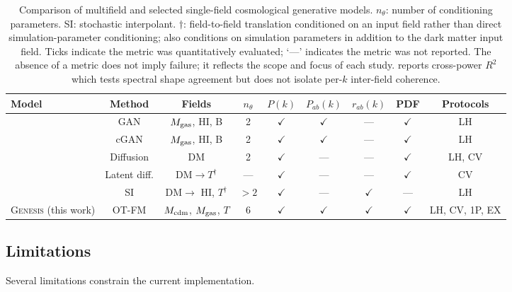 \documentclass[usenatbib]{mnras}
\newcommand{\Mcdm}{M_{\rm cdm}}
\newcommand{\Mgas}{M_{\rm gas}}
\newcommand{\Tgas}{T}
\begin{document}
\begin{table}
  \centering
  \begin{tabular}{lcccccccc}
    \hline
    Model & Method & Fields & $n_\theta$ & $P(k)$ & $P_{ab}(k)$ &
      $r_{ab}(k)$ & PDF & Protocols \\
    \hline
    \citet{Andrianomena2022} & GAN & $\Mgas$, HI, B & 2
      & $\checkmark$ & $\checkmark$ & --- & $\checkmark$ & LH \\
    \citet{Andrianomena2024} & cGAN & $\Mgas$, HI, B & 2
      & $\checkmark$ & $\checkmark$ & --- & $\checkmark$ & LH \\
    \citet{Mudur2024} & Diffusion & DM & 2
      & $\checkmark$ & --- & --- & $\checkmark$ & LH, CV \\
    \citet{Mishra2026} & Latent diff. & DM$\rightarrow T^\dagger$ & ---
      & $\checkmark$ & --- & --- & $\checkmark$ & CV \\
    \citet{Horowitz2025} & SI & DM$\rightarrow$ HI, $T^\dagger$ & $>2$
      & $\checkmark$ & --- & $\checkmark$ & --- & LH \\
    \textsc{Genesis} (this work) & OT-FM
      & $\Mcdm$, $\Mgas$, $\Tgas$ & 6
      & $\checkmark$ & $\checkmark$ & $\checkmark$ & $\checkmark$
      & LH, CV, 1P, EX \\
    \hline
  \end{tabular}
  \caption{Comparison of multifield and selected single-field
    cosmological generative models.
    $n_\theta$: number of conditioning parameters.
    SI: stochastic interpolant.
    $\dagger$: field-to-field translation conditioned on an input field
    rather than direct simulation-parameter conditioning;
    \citet{Horowitz2025} also conditions on simulation parameters in
    addition to the dark matter input field.
    Ticks indicate the metric was quantitatively evaluated;
    `---' indicates the metric was not reported.
    The absence of a metric does not imply failure; it reflects the
    scope and focus of each study.
    \citet{Andrianomena2024} reports cross-power $R^2$ which tests
    spectral shape agreement but does not isolate per-$k$ inter-field
    coherence.}
  \label{tab:comparison}
\end{table}

\subsection{Limitations}
\label{sec:disc_limitations}

Several limitations constrain the current implementation.
\end{document}
